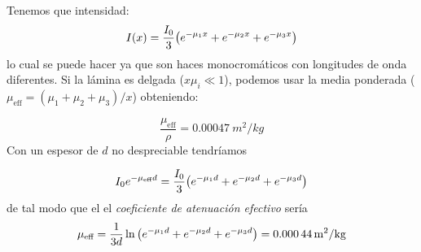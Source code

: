 Tenemos que intensidad:
\begin{equation}
    I(x) = \frac{I_0}{3}\pqty{e^{-\mu_1 x}+e^{-\mu_2 x} + e^{-\mu_3x}}
\end{equation}
lo cual se puede hacer ya que son haces monocromáticos con longitudes de onda diferentes. Si la lámina es delgada ($x \mu_i \ll 1$), podemos usar la media ponderada ($\mu_{\text{eff}} = (\mu_1 + \mu_2 + \mu_3)/x$) obteniendo: 

\begin{equation}
    \frac{\mu_{\text{eff}}}{\rho} = \SI{0.00047}{m^2 / kg}    
\end{equation}
Con un espesor de $d$ no despreciable tendríamos

\begin{equation}
    I_0 e^{-\mu_{\text{eff}} d} = \frac{I_0}{3}\pqty{e^{-\mu_1 d}+e^{-\mu_2 d} + e^{-\mu_3 d}}
\end{equation}
de tal modo que el el \textit{coeficiente de atenuación efectivo} sería
\begin{equation}
    \mu_{\text{eff}} =  \frac{1}{3d} \ln \pqty{e^{-\mu_1 d}+e^{-\mu_2 d} + e^{-\mu_3 d}} = \SI{0.00044}{m^2/kg}
\end{equation}